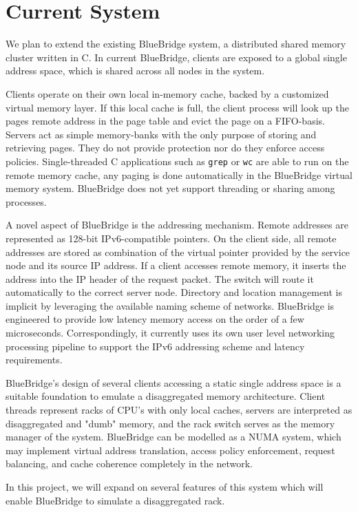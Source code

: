 \section{Current System}
\label{sec:current}

We plan to extend the existing BlueBridge system, a distributed shared
memory cluster written in C. In current BlueBridge, clients are
exposed to a global single address space, which is shared across all
nodes in the system.

Clients operate on their own local in-memory cache, backed by a
customized virtual memory layer. If this local cache is full, the
client process will look up the pages remote address in the page table
and evict the page on a FIFO-basis.  Servers act as simple
memory-banks with the only purpose of storing and retrieving pages.
They do not provide protection nor do they enforce access policies.
Single-threaded C applications such as \texttt{grep} or \texttt{wc}
are able to run on the remote memory cache, any paging is done
automatically in the BlueBridge virtual memory system.  BlueBridge
does not yet support threading or sharing among processes.

A novel aspect of BlueBridge is the addressing mechanism. Remote
addresses are represented as 128-bit IPv6-compatible pointers. On the
client side, all remote addresses are stored as combination of the
virtual pointer provided by the service node and its source IP
address. If a client accesses remote memory, it inserts the address
into the IP header of the request packet. The switch will route it
automatically to the correct server node. Directory and location
management is implicit by leveraging the available naming scheme of
networks.  BlueBridge is engineered to provide low latency memory
access on the order of a few microseconds. Correspondingly, it
currently uses its own user level networking processing pipeline to
support the IPv6 addressing scheme and latency requirements.

BlueBridge's design of several clients accessing a static single
address space is a suitable foundation to emulate a disaggregated
memory architecture. Client threads represent racks of CPU's with only
local caches, servers are interpreted as disaggregated and "dumb"
memory, and the rack switch serves as the memory manager of the
system.  BlueBridge can be modelled as a NUMA system, which may
implement virtual address translation, access policy enforcement,
request balancing, and cache coherence completely in the network.

In this project, we will expand on several features of this system
which will enable BlueBridge to simulate a disaggregated rack.
